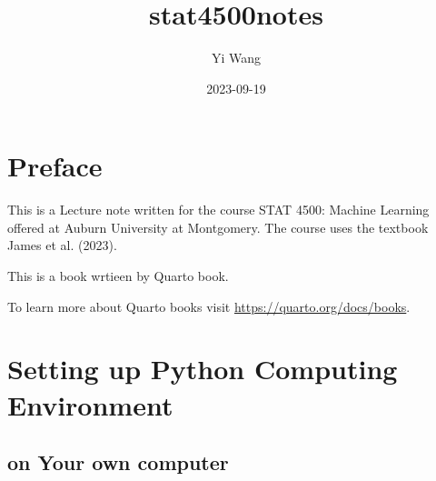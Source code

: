 \documentclass[
  letterpaper,
  DIV=11,
  numbers=noendperiod]{scrreprt}
\title{stat4500notes}
\author{Yi Wang}
\date{2023-09-19}
\renewcommand*\contentsname{Table of contents}
\newcommand\contentsname{Table of contents}
\begin{document}
\maketitle
\renewcommand*\contentsname{Table of contents}
{
\hypersetup{linkcolor=}
\setcounter{tocdepth}{2}
\tableofcontents
}

\chapter*{Preface}\label{preface}


This is a Lecture note written for the course STAT 4500: Machine
Learning offered at Auburn University at Montgomery. The course uses the
textbook James et al. (2023).

This is a book wrtieen by Quarto book.

To learn more about Quarto books visit
\url{https://quarto.org/docs/books}.


\chapter{Setting up Python Computing
Environment}\label{setting-up-python-computing-environment}

\section{on Your own computer}\label{on-your-own-computer}
\end{document}
